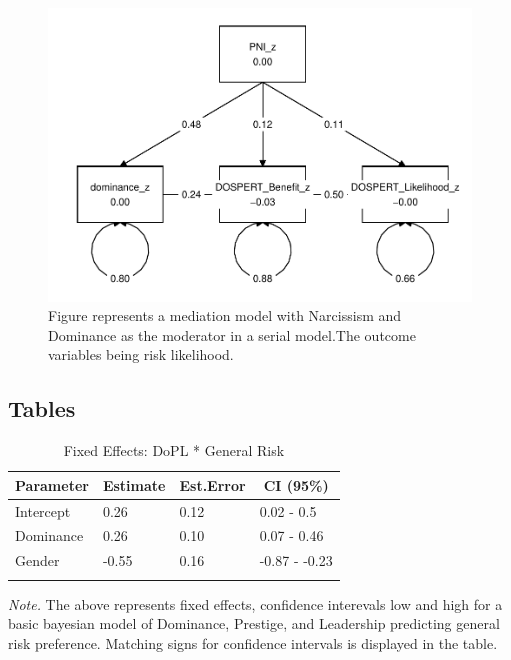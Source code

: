 \documentclass[
  donotrepeattitle,doc, 12pt, a4paper,floatsintext]{apa7}
\begin{document}
\begin{figure}

{\centering \includegraphics[width=1\linewidth]{Output_Files/DoPL-Experiment_files/figure-latex/MediationFit3-1} 

}

\caption{Figure represents a mediation model with Narcissism and Dominance as the moderator in a serial model.The outcome variables being risk likelihood.}\label{fig:MediationFit3}
\end{figure}

\newpage

\hypertarget{tables}{%
\subsection{Tables}\label{tables}}

\begin{table}[ht]

\begin{center}
\begin{threeparttable}

\caption{\label{tab:m1-fixef-Experiment-1}Fixed Effects: DoPL * General Risk}

\begin{tabular}{llll}
\toprule
Parameter & \multicolumn{1}{c}{Estimate} & \multicolumn{1}{c}{Est.Error} & \multicolumn{1}{c}{CI (95\%)}\\
\midrule
Intercept & 0.26 & 0.12 & 0.02 - 0.5\\
Dominance & 0.26 & 0.10 & 0.07 - 0.46\\
Gender & -0.55 & 0.16 & -0.87 - -0.23\\
\bottomrule
\addlinespace
\end{tabular}

\begin{tablenotes}[para]
\normalsize{\textit{Note.} The above represents fixed effects, confidence interevals low and high for a basic bayesian model of Dominance, Prestige, and Leadership predicting general risk preference. Matching signs for confidence intervals is displayed in the table.}
\end{tablenotes}

\end{threeparttable}
\end{center}

\end{table}
\end{document}
